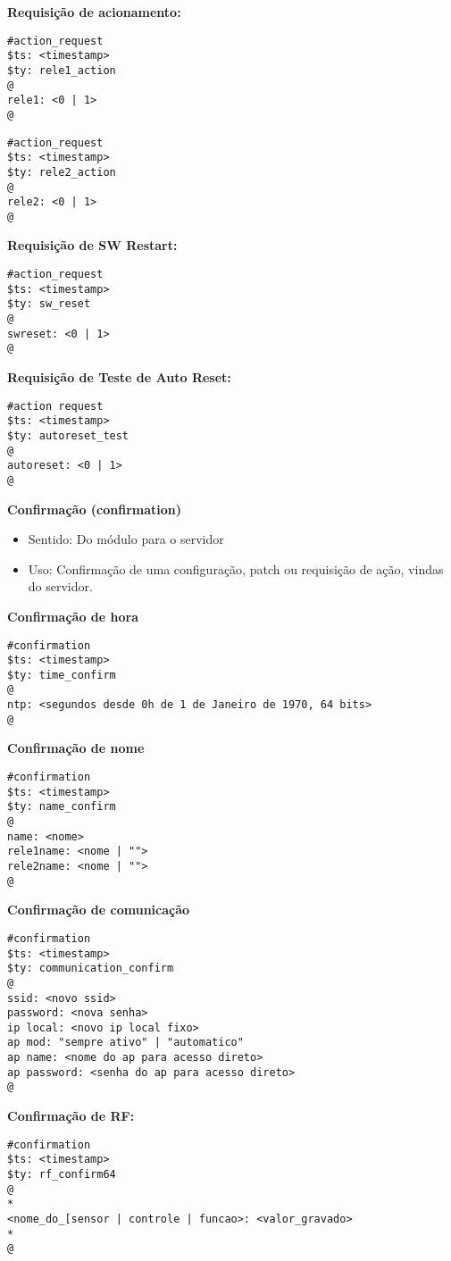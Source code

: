 \textbf{Requisição de acionamento:}
\begin{lstlisting}
#action_request
$ts: <timestamp>
$ty: rele1_action
@
rele1: <0 | 1>
@
\end{lstlisting}

\begin{lstlisting}
#action_request
$ts: <timestamp>
$ty: rele2_action
@
rele2: <0 | 1>
@
\end{lstlisting}

\textbf{Requisição de SW Restart:}
\begin{lstlisting}
#action_request
$ts: <timestamp>
$ty: sw_reset
@
swreset: <0 | 1>
@
\end{lstlisting}

\textbf{Requisição de Teste de Auto Reset:}
\begin{lstlisting}
#action request
$ts: <timestamp>
$ty: autoreset_test
@
autoreset: <0 | 1>
@
\end{lstlisting}

\textbf{Confirmação (confirmation)}
\begin{itemize}
\item Sentido: Do módulo para o servidor
\item Uso: Confirmação de uma configuração, patch ou requisição de ação, vindas do servidor.
\end{itemize}

\textbf{Confirmação de hora}
\begin{lstlisting}
#confirmation
$ts: <timestamp>
$ty: time_confirm
@
ntp: <segundos desde 0h de 1 de Janeiro de 1970, 64 bits>
@
\end{lstlisting}

\textbf{Confirmação de nome}
\begin{lstlisting}
#confirmation
$ts: <timestamp>
$ty: name_confirm
@
name: <nome>
rele1name: <nome | "">
rele2name: <nome | "">
@
\end{lstlisting}

\textbf{Confirmação de comunicação}
\begin{lstlisting}
#confirmation
$ts: <timestamp>
$ty: communication_confirm
@
ssid: <novo ssid>
password: <nova senha>
ip local: <novo ip local fixo>
ap mod: "sempre ativo" | "automatico"
ap name: <nome do ap para acesso direto>
ap password: <senha do ap para acesso direto>
@
\end{lstlisting}

\textbf{Confirmação de RF:}
\begin{lstlisting}
#confirmation
$ts: <timestamp>
$ty: rf_confirm64
@
*
<nome_do_[sensor | controle | funcao>: <valor_gravado>
*
@
\end{lstlisting}

